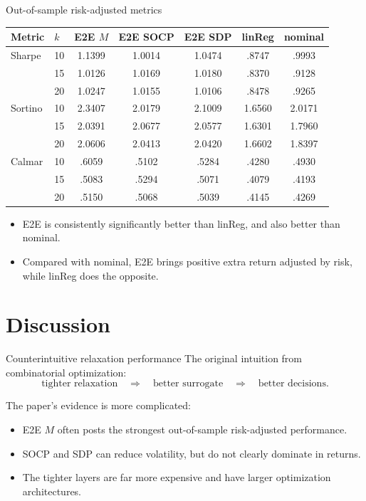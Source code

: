 \documentclass[10pt,aspectratio=169]{beamer}
\newcommand{\Kcard}{k}
\begin{document}
\begin{frame}{Out-of-sample risk-adjusted metrics}
  \centering\footnotesize
  \begin{tabular}{llccccc}
    \toprule
    Metric & $\Kcard$ & E2E $M$ & E2E SOCP & E2E SDP & linReg & nominal \\
    \midrule
    Sharpe & 10 & 1.1399 & 1.0014 & 1.0474 & .8747 & .9993 \\
           & 15 & 1.0126 & 1.0169 & 1.0180 & .8370 & .9128 \\
           & 20 & 1.0247 & 1.0155 & 1.0106 & .8478 & .9265 \\
    \midrule
    Sortino & 10 & 2.3407 & 2.0179 & 2.1009 & 1.6560 & 2.0171 \\
            & 15 & 2.0391 & 2.0677 & 2.0577 & 1.6301 & 1.7960 \\
            & 20 & 2.0606 & 2.0413 & 2.0420 & 1.6602 & 1.8397 \\
    \midrule
    Calmar & 10 & .6059 & .5102 & .5284 & .4280 & .4930 \\
           & 15 & .5083 & .5294 & .5071 & .4079 & .4193 \\
           & 20 & .5150 & .5068 & .5039 & .4145 & .4269 \\
    \bottomrule
  \end{tabular}
\vspace{.2em}
\begin{itemize}
  \item E2E is consistently significantly better than linReg, and also better than nominal.
  \item Compared with nominal, E2E brings positive extra return adjusted by risk, while linReg does the opposite.
\end{itemize}

\end{frame}

\section{Discussion}

\begin{frame}{Counterintuitive relaxation performance}
  \small 
  The original intuition from combinatorial optimization:
  \[
    \text{tighter relaxation}
    \quad\Rightarrow\quad
    \text{better surrogate}
    \quad\Rightarrow\quad
    \text{better decisions}.
  \]

  The paper's evidence is more complicated:
  \begin{itemize}
    \item E2E $M$ often posts the strongest out-of-sample risk-adjusted performance.
    \item SOCP and SDP can reduce volatility, but do not clearly dominate in returns.
    \item The tighter layers are far more expensive and have larger optimization architectures.
  \end{itemize}

\end{frame}
\end{document}
